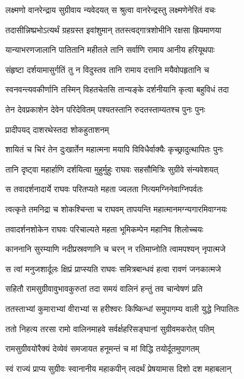 \twolineshloka
{लक्ष्मणो वानरेन्द्राय सुग्रीवाय न्यवेदयत्}
{स श्रुत्वा वानरेन्द्रस्तु लक्ष्मणेनेरितं वचः} %

\twolineshloka
{तदासीन्निष्प्रभोऽत्यर्थं ग्रहग्रस्त इवांशुमान्}
{ततस्त्वद्गात्रशोभीनि रक्षसा ह्रियमाणया} %

\twolineshloka
{यान्याभरणजालानि पातितानि महीतले}
{तानि सर्वाणि रामाय आनीय हरियूथपाः} %

\twolineshloka
{संहृष्टा दर्शयामासुर्गतिं तु न विदुस्तव}
{तानि रामाय दत्तानि मयैवोपहृतानि च} %

\twolineshloka
{स्वनवन्त्यवकीर्णानि तस्मिन् विहतचेतसि}
{तान्यङ्के दर्शनीयानि कृत्वा बहुविधं तदा} %

\twolineshloka
{तेन देवप्रकाशेन देवेन परिदेवितम्}
{पश्यतस्तानि रुदतस्ताम्यतश्च पुनः पुनः} %

\onelineshloka
{प्रादीपयद् दाशरथेस्तदा शोकहुताशनम्} %

\twolineshloka
{शायितं च चिरं तेन दुःखार्तेन महात्मना}
{मयापि विविधैर्वाक्यैः कृच्छ्रादुत्थापितः पुनः} %

\twolineshloka
{तानि दृष्ट्वा महार्हाणि दर्शयित्वा मुहुर्मुहुः}
{राघवः सहसौमित्रिः सुग्रीवे संन्यवेशयत्} %

\twolineshloka
{स तवादर्शनादार्ये राघवः परितप्यते}
{महता ज्वलता नित्यमग्निनेवाग्निपर्वतः} %

\twolineshloka
{त्वत्कृते तमनिद्रा च शोकश्चिन्ता च राघवम्}
{तापयन्ति महात्मानमग्न्यगारमिवाग्नयः} %

\twolineshloka
{तवादर्शनशोकेन राघवः परिचाल्यते}
{महता भूमिकम्पेन महानिव शिलोच्चयः} %

\twolineshloka
{काननानि सुरम्याणि नदीप्रस्रवणानि च}
{चरन् न रतिमाप्नोति त्वामपश्यन् नृपात्मजे} %

\twolineshloka
{स त्वां मनुजशार्दूलः क्षिप्रं प्राप्स्यति राघवः}
{समित्रबान्धवं हत्वा रावणं जनकात्मजे} %

\twolineshloka
{सहितौ रामसुग्रीवावुभावकुरुतां तदा}
{समयं वालिनं हन्तुं तव चान्वेषणं प्रति} %

\twolineshloka
{ततस्ताभ्यां कुमाराभ्यां वीराभ्यां स हरीश्वरः}
{किष्किन्धां समुपागम्य वाली युद्धे निपातितः} %

\twolineshloka
{ततो निहत्य तरसा रामो वालिनमाहवे}
{सर्वर्क्षहरिसङ्घानां सुग्रीवमकरोत् पतिम्} %

\twolineshloka
{रामसुग्रीवयोरैक्यं देव्येवं समजायत}
{हनूमन्तं च मां विद्धि तयोर्दूतमुपागतम्} %

\twolineshloka
{स्वं राज्यं प्राप्य सुग्रीवः स्वानानीय महाकपीन्}
{त्वदर्थं प्रेषयामास दिशो दश महाबलान्} %

